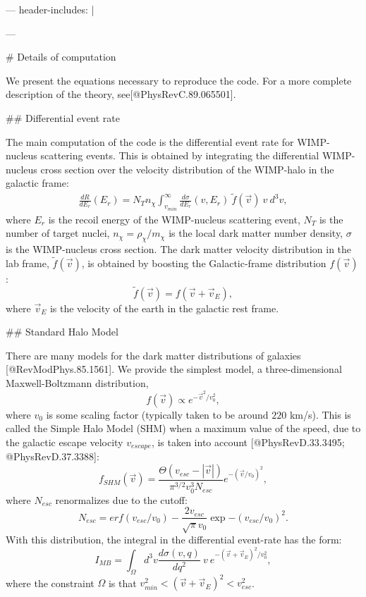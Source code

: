 ---
header-includes: |
    \usepackage{amsmath}
    \usepackage{physics}
---

# Details of computation

We present the equations necessary to reproduce the code. For a more complete
description of the theory, see[@PhysRevC.89.065501].

## Differential event rate

The main computation of the code is the differential event rate for WIMP-nucleus
scattering events. This is obtained by integrating the differential WIMP-nucleus
cross section over the velocity distribution of the WIMP-halo in the galactic
frame: \begin{equation}\label{ER}
\begin{split}
	\frac{dR}{dE_r}(E_r)
	 = N_T n_\chi \int_{v_{min}}^{\infty} \frac{d\sigma}{dE_r}(v,E_r)\ \tilde{f}(\vec{v})\ v\ d^3v,
\end{split}
\end{equation}
where $E_r$ is the recoil energy of the WIMP-nucleus scattering event, $N_T$ is
the number of target nuclei, $n_\chi = \rho_\chi/m_\chi$ is the local dark
matter number density, $\sigma$ is the WIMP-nucleus cross section.  The dark
matter velocity distribution in the lab frame, $\tilde{f}(\vec{v})$, is obtained
by boosting the Galactic-frame distribution $f(\vec{v})$:
\begin{equation}
    \tilde{f}(\vec{v}) = f(\vec{v} + \vec{v}_E),
\end{equation} 
where $\vec{v}_{E}$ is the velocity of the earth in the galactic rest frame.

## Standard Halo Model

There are many models for the dark matter distributions of galaxies
[@RevModPhys.85.1561].  We provide the simplest model, a three-dimensional
Maxwell-Boltzmann distribution,
\begin{equation}
	f(\vec{v}) \propto e^{-\vec{v}^2/v_0^2},
\end{equation}
where $v_0$ is some scaling factor (typically taken to be around $220$ km/s).
This is called the Simple Halo Model (SHM) when a maximum value of the speed,
due to the galactic escape velocity $v_{escape}$, is taken into account
[@PhysRevD.33.3495; @PhysRevD.37.3388]:
\begin{equation}
    f_{SHM}(\vec{v}) = \frac{\Theta(v_{esc}-|\vec{v}|)}{\pi^{3/2}v_0^3N_{esc}} 
    e^{-(\vec{v}/v_0)^2},
\end{equation}
where $N_{esc}$ renormalizes due to the cutoff:
\begin{equation}
    N_{esc} = erf{(v_{esc}/v_0)} - \frac{2v_{esc}}{\sqrt{\pi}v_0}
    \exp{-(v_{esc}/v_0)^2}.
\end{equation}
With this distribution, the integral in the differential
event-rate has the form: 
\begin{equation}
    I_{MB} = \int_{\Omega} d^3v \frac{d\sigma(v,q)}{d{q}^2}\ v\ e^{-(\vec{v}+\vec{v}_E)^2/v_0^2},
\end{equation}
where the constraint $\Omega$ is that $v_{min}^2<(\vec{v}+\vec{v}_E)^2<v_{esc}^2$.

